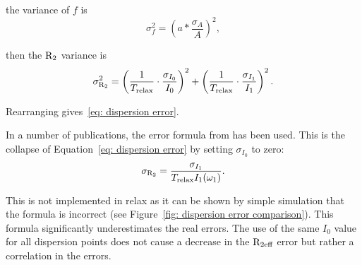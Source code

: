 the variance of $f$ is
\begin{equation}
    \sigma_f^2 = \left( a * \frac{\sigma_A}{A} \right)^2 ,
\end{equation}

then the $\mathrm{R}_2$ variance is
\begin{equation}
    \sigma_{\mathrm{R}_2}^2 = \left( \frac{1}{T_{\textrm{relax}}} \cdot \frac{\sigma_{I_0}}{I_0} \right)^2 + \left( \frac{1}{T_{\textrm{relax}}} \cdot \frac{\sigma_{I_1}}{I_1} \right)^2.
\end{equation}

Rearranging gives~\ref{eq: dispersion error}.

In a number of publications, the error formula from \citet{IshimaTorchia05} has been used.
This is the collapse of Equation~\ref{eq: dispersion error} by setting $\sigma_{I_0}$ to zero:
\begin{equation} \label{eq: IT05 dispersion error}
    \sigma_{\mathrm{R}_2} = \frac{\sigma_{I_1}}{T_{\textrm{relax}} I_1(\omega_1)} .
\end{equation}

This is not implemented in relax as it can be shown by simple simulation that the formula is incorrect (see Figure~\ref{fig: dispersion error comparison}).
This formula significantly underestimates the real errors.
The use of the same $I_0$ value for all dispersion points does not cause a decrease in the $\mathrm{R}_{\textrm{2eff}}$ error but rather a correlation in the errors.

